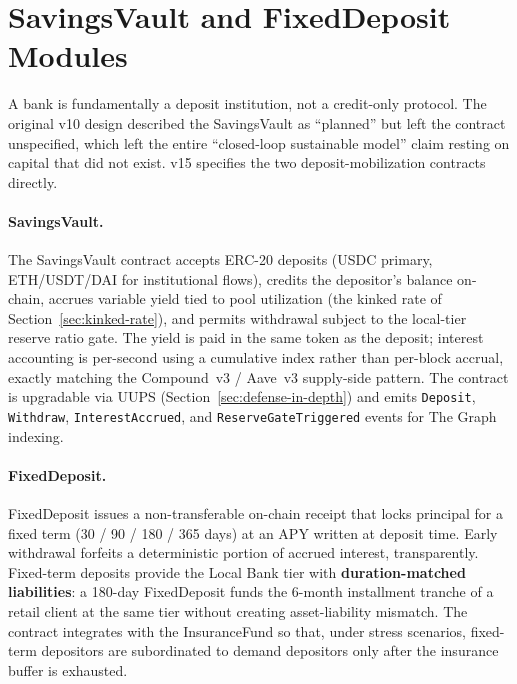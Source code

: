 \documentclass[12pt,a4paper]{report}
\begin{document}
\section{SavingsVault and FixedDeposit Modules}
\label{sec:savings-vault}

A bank is fundamentally a deposit institution, not a credit-only protocol. The original v10 design described the SavingsVault as ``planned'' but left the contract unspecified, which left the entire ``closed-loop sustainable model'' claim resting on capital that did not exist. v15 specifies the two deposit-mobilization contracts directly.

\paragraph{SavingsVault.}
The SavingsVault contract accepts ERC-20 deposits (USDC primary, ETH/USDT/DAI for institutional flows), credits the depositor's balance on-chain, accrues variable yield tied to pool utilization (the kinked rate of Section~\ref{sec:kinked-rate}), and permits withdrawal subject to the local-tier reserve ratio gate. The yield is paid in the same token as the deposit; interest accounting is per-second using a cumulative index rather than per-block accrual, exactly matching the Compound~v3 / Aave~v3 supply-side pattern. The contract is upgradable via UUPS (Section~\ref{sec:defense-in-depth}) and emits \texttt{Deposit}, \texttt{Withdraw}, \texttt{InterestAccrued}, and \texttt{ReserveGateTriggered} events for The Graph indexing.

\paragraph{FixedDeposit.}
FixedDeposit issues a non-transferable on-chain receipt that locks principal for a fixed term (30 / 90 / 180 / 365 days) at an APY written at deposit time. Early withdrawal forfeits a deterministic portion of accrued interest, transparently. Fixed-term deposits provide the Local Bank tier with \textbf{duration-matched liabilities}: a 180-day FixedDeposit funds the 6-month installment tranche of a retail client at the same tier without creating asset-liability mismatch. The contract integrates with the InsuranceFund so that, under stress scenarios, fixed-term depositors are subordinated to demand depositors only after the insurance buffer is exhausted.
\end{document}
